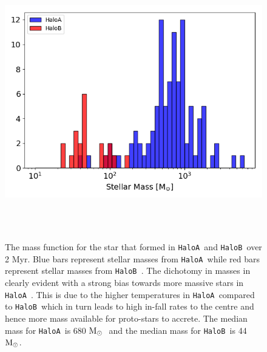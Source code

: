 \documentclass[graphics, twocolumn, usenatbib]{mn2e}
\newcommand{\msolar} {$\rm{M_{\odot}}~$}
\newcommand{\msolarc} {$\rm{M_{\odot}}$}
\newcommand{\ha} {\texttt{HaloA~}}
\newcommand{\hb} {\texttt{HaloB~}}
\begin{document}
\begin{figure}
\centering
\begin{minipage}{175mm}      \begin{center}
\centerline{
    \includegraphics[width=18.0cm, height=12cm]{FIGURES/FinalMass_MultipleHaloes.png}}
\caption{
  The mass function for the star that formed in \ha and \hb over 2 Myr. Blue bars represent
  stellar masses from \ha while red bars represent stellar masses from \hb. The dichotomy in
  masses in clearly evident with a strong bias towards more massive stars in \ha. This is due to the
  higher temperatures in \ha compared to \hb which in turn leads to high in-fall rates to the centre
  and hence more mass available for proto-stars to accrete. The median mass for \ha is 680 \msolar
  and the median mass for \hb is 44 \msolarc. 
}
\label{Fig:MassFunction}
\end{center} \end{minipage}
\end{figure}
\end{document}
